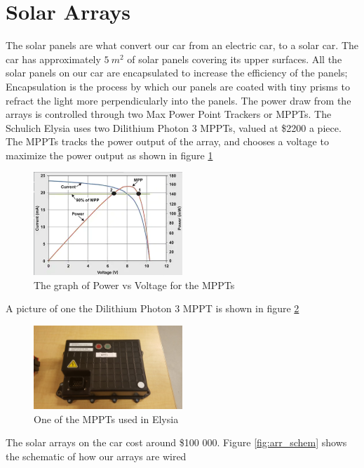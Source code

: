\documentclass[titlepage]{article}
\begin{document}
    \section{Solar Arrays}
    The solar panels are what convert our car from an electric car, to a
    solar car. The car has approximately $5\ m^2$ of solar panels
    covering its upper surfaces. All the solar panels on our car are
    encapsulated to increase the efficiency of the panels; Encapsulation
    is the process by which our panels are coated with tiny prisms to
    refract the light more perpendicularly into the panels. The power
    draw from the arrays is controlled through two Max Power Point
    Trackers or MPPTs. The Schulich Elysia uses two Dilithium Photon 3
    MPPTs, valued at \$2200 a piece. The MPPTs tracks the power output
    of the array, and chooses a voltage to maximize the power output as
    shown in figure \ref{fig:mppt-graph}
    \begin{figure}[H]
        \centering
        \includegraphics[width=0.5\textwidth]{images/MPPT_Diagram.png}
        \caption{The graph of Power vs Voltage for the MPPTs}
        \label{fig:mppt-graph}
    \end{figure}
    A picture of one the Dilithium Photon 3 MPPT is shown in figure
    \ref{fig:mppt}
    \begin{figure}[H]
        \centering
        \includegraphics[width=0.5\textwidth]{images/mppt.jpg}
        \caption{One of the MPPTs used in Elysia}
        \label{fig:mppt}
    \end{figure}
    The solar arrays on the car cost around \$100 000. Figure
    \ref{fig:arr_schem} shows the schematic of how our arrays are wired
\end{document}
